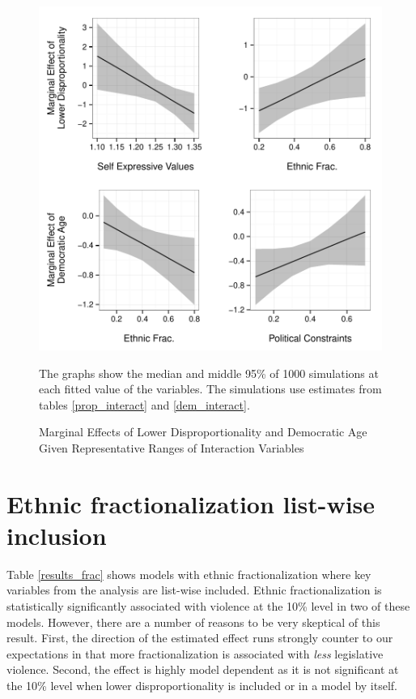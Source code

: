 \documentclass[a4paper]{article}\usepackage[]{graphicx}\usepackage[]{color}
\newenvironment{knitrout}{}{} %
\begin{document}
\begin{figure}[H]
    \begin{center}
\begin{knitrout}
\color{fgcolor}
\includegraphics[width=0.95\linewidth]{figure/marginalEffects-1} 

\end{knitrout}
    \end{center}
    \caption{Marginal Effects of Lower Disproportionality and Democratic Age Given Representative Ranges of Interaction Variables}
    \label{marginal_effect_plot}
    \begin{singlespace}
      {\scriptsize{The graphs show the median and middle 95\% of 1000 simulations at each fitted value of the variables. The simulations use estimates from tables \ref{prop_interact} and \ref{dem_interact}.}}
    \end{singlespace}
\end{figure}


\section*{Ethnic fractionalization list-wise inclusion}


Table \ref{results_frac} shows models with ethnic fractionalization where key variables from the analysis are list-wise included. Ethnic fractionalization is statistically significantly associated with violence at the 10\% level in two of these models. However, there are a number of reasons to be very skeptical of this result. First, the direction of the estimated effect runs strongly counter to our expectations in that more fractionalization is associated with \emph{less} legislative violence. Second, the effect is highly model dependent as it is not significant at the 10\% level when lower disproportionality is included or in a model by itself.
\end{document}
